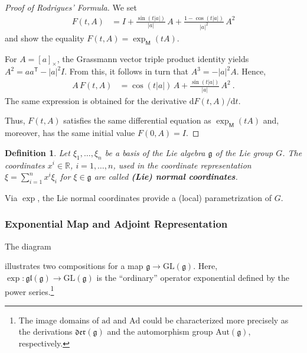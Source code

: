 \documentclass[10pt,a4paper]{article}
\theoremstyle{mytheorem}
\theoremstyle{mydefinition}
\newtheorem{definition}[theorem]{Definition}
\newcommand{\mydef}[1]{\textbf{\textit{#1}}}
\newcommand{\trans}{^\mathsf{T}}
\newcommand{\dt}{\mathrm{d}}
\newcommand{\ad}{\mathrm{ad}}
\newcommand{\Ad}{\mathrm{Ad}}
\newcommand{\fg}{\mathfrak{g}}
\begin{document}
\begin{proof}[Proof of Rodrigues' Formula]
We set
\begin{align*}
	F(t,A) &=
	I 
	+ \frac{\sin(t|a|)}{|a|}\,A
	+ \frac{1 - \cos(t|a|)}{|a|^2}\,A^2
\end{align*} 
and show the equality $F(t,A)=\exp_\mathsf{M}(tA)$.

For $A=[a]_\times$, the Grassmann vector triple product identity yields $A^2=aa\trans - |a|^2I$.
From this, it follows in turn that $A^3=-|a|^2A$.
Hence,
\begin{align*}
	A\,F(t,A)
	&=
	\cos(t|a|)\,A
	+
	\frac{\sin(t|a|)}{|a|}\,A^2
	\ .	
\end{align*}
The same expression is obtained for the derivative $\dt F(t,A)/\dt t$.

Thus, $F(t,A)$ satisfies the same differential equation as $\exp_\mathsf{M}(tA)$ and, moreover, has the same initial value $F(0,A)=I$.
\end{proof}

\begin{definition}
\label{def:normalcoords}
Let $\xi_1,\ldots,\xi_n$ be a basis of the Lie algebra $\mathfrak{g}$ of the Lie group $G$.
The coordinates $x^i\in\mathbb{R}$, $i=1,\ldots,n$, used in the coordinate representation $\xi=\sum_{i=1}^n x^i\xi_i$ for $\xi\in\mathfrak{g}$ are called \mydef{(Lie) normal coordinates}.
\end{definition}
Via $\exp$, the Lie normal coordinates provide a (local) parametrization of $G$.

\subsubsection{Exponential Map and Adjoint Representation}

The diagram
\begin{center}
\end{center}
illustrates two compositions for a map $\mathfrak{g}\rightarrow\mathrm{GL}(\mathfrak{g})$.
Here, $\exp:\mathfrak{gl}(\mathfrak{g})\rightarrow\mathrm{GL}(\mathfrak{g})$ is the ``ordinary'' operator exponential defined by the power series.\footnote{
	The image domains of $\ad$ and $\Ad$ could be characterized more precisely as the derivations $\mathfrak{der}(\fg)$ and the automorphism group $\mathrm{Aut}(\fg)$, respectively.
}
\end{document}
